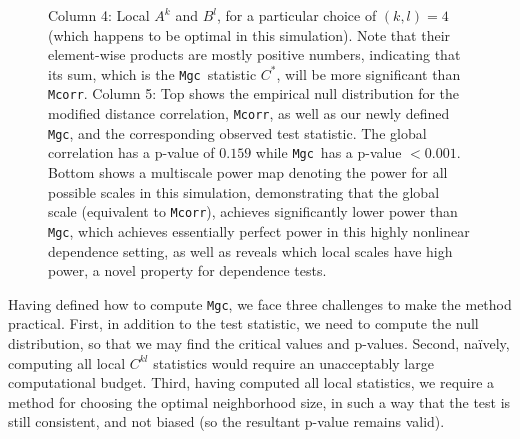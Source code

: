 \documentclass[11pt]{article}
\providecommand{\sct}[1]{{\sc \texttt{#1}}}
\providecommand{\mc}[1]{\mathcal{#1}}
\newcommand{\G}{C}
\newcommand{\Mgc}{\sct{Mgc}}
\newcommand{\Mcorr}{\sct{Mcorr}}
\begin{document}
\begin{figure}[htbp]
{Column 4: Local $A^{k}$ and $B^{l}$, for a particular choice of $(k,l)=4$ (which happens to be optimal in this simulation). Note that their element-wise products are mostly positive numbers, indicating that its sum, which is the \Mgc~statistic $\G^*$, will be more significant than \Mcorr.
Column 5: Top shows the empirical null distribution for the modified distance correlation, \Mcorr \cite{SzekelyRizzo2013a}, as well as our newly defined \Mgc, and the corresponding observed test statistic. The global correlation has a p-value of $0.159$ while \Mgc~has a p-value $<0.001$.
Bottom shows a multiscale power map denoting the power for all possible scales in this simulation, demonstrating that the global scale (equivalent to \Mcorr), achieves significantly lower power than \Mgc, which achieves essentially perfect power in this highly nonlinear dependence setting, as well as reveals which local scales have high power, a novel property for dependence tests.
}
\label{f:schematic}
\end{figure}
%

Having defined how to compute \Mgc, we face three challenges to make the method practical. First, in addition to the test statistic, we need to compute the null distribution, so that we may find the critical values and p-values.
Second, na\"ively, computing all local $\G^{kl}$ statistics would require an unacceptably large computational budget.
Third, having computed all local statistics, we require a method for choosing the optimal neighborhood size, in such a way that the test is still consistent, and not biased (so the resultant p-value remains valid).
\end{document}
